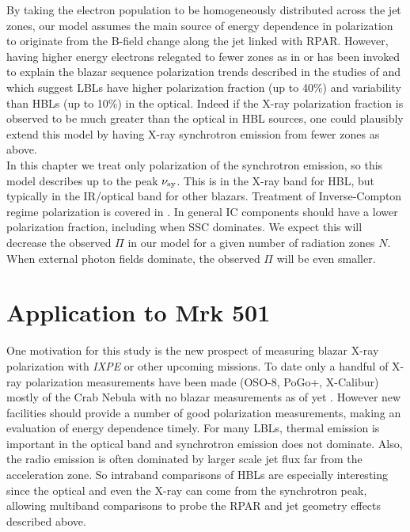 By taking the electron population to be homogeneously distributed across the jet zones, our model assumes the main source of energy dependence in polarization to originate from the B-field change along the jet linked with RPAR. However, having higher energy electrons relegated to fewer zones as in \citet{marscher_rapid_2010} or \citet{angelakis_robopol:_2016} has been invoked to explain the blazar sequence polarization trends described in the studies of \citet{itoh_systematic_2016} and \citet{angelakis_robopol:_2016} which suggest LBLs have higher polarization fraction (up to 40\%) and variability than HBLs (up to 10\%) in the optical. Indeed if the X-ray polarization fraction is observed to be much greater than the optical in HBL sources, one could plausibly extend this model by having X-ray synchrotron emission from fewer zones as above. \\ 
In this chapter we treat only polarization of the synchrotron emission, so this model describes up to the peak $\nu_{\rm sy}$. This is in the X-ray band for HBL, but typically in the IR/optical band for other blazars. Treatment of Inverse-Compton regime polarization is covered in \citet{zhang_polarization_2016}. In general IC components should have a lower polarization fraction, including when SSC dominates. We expect this will decrease the observed $\Pi$ in our model for a given number of radiation zones $N$. When external photon fields dominate, the observed $\Pi$ will be even smaller. 

\section{Application to Mrk 501}
	One motivation for this study is the new prospect of measuring blazar X-ray polarization with {\it IXPE} \citep{weisskopf_imaging_2016} or other upcoming missions. To date only a handful of X-ray polarization measurements have been made (OSO-8, PoGo+, X-Calibur) mostly of the Crab Nebula with no blazar measurements as of yet \citep{kislat_optimization_2018}. However new facilities should provide a number of good polarization measurements, making an evaluation of energy dependence timely.
For many LBLs, thermal emission is important in the optical band and synchrotron emission does not dominate. Also, the radio emission is often dominated by larger scale jet flux far from the acceleration zone. So intraband comparisons of HBLs are especially interesting since the optical and even the X-ray can come from the synchrotron peak, allowing multiband comparisons to probe the RPAR and jet geometry effects described above. 
    

